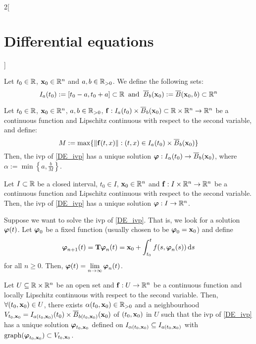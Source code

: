 \documentclass[../../../main_math.tex]{subfiles}
\begin{document}
\begin{multicols}{2}[\section{Differential equations}]
\begin{corollary}
  \end{corollary}
  \begin{definition}
    Let $t_0\in\mathbb{R}$, $\boldsymbol{\mathrm{x}}_0\in\mathbb{R}^n$ and $a,b\in\mathbb{R}_{>0}$. We define the following sets: $$I_a(t_0):=[t_0-a,t_0+a]\subset\mathbb{R}\;\;\text{and}\;\;\overline{B}_{b}(\boldsymbol{\mathrm{x}}_0):=\overline{B}(\boldsymbol{\mathrm{x}}_0,b)\subset\mathbb{R}^n$$
  \end{definition}
  \begin{theorem}\label{DE_picard}
    Let $t_0\in\mathbb{R}$, $\boldsymbol{\mathrm{x}}_0\in\mathbb{R}^n$, $a,b\in\mathbb{R}_{>0}$, $\boldsymbol{\mathrm{f}}:I_a(t_0)\times\overline{B}_{b}(\boldsymbol{\mathrm{x}}_0)\subset\mathbb{R}\times\mathbb{R}^n\rightarrow\mathbb{R}^n$ be a continuous function and Lipschitz continuous with respect to the second variable, and define: $$M:=\max\{\|\boldsymbol{\mathrm{f}}(t,x)\|:(t,x)\in I_a(t_0)\times\overline{B}_{b}(\boldsymbol{\mathrm{x}}_0)\}$$ Then, the ivp of \cref{DE_ivp} has a unique solution $\boldsymbol{\mathrm{\varphi}}:I_\alpha(t_0)\rightarrow\overline{B}_{b}(\boldsymbol{\mathrm{x}}_0)$, where $\alpha:=\min\left\{a,\frac{b}{M}\right\}$.
  \end{theorem}
  \begin{corollary}
    Let $I\subset \mathbb{R}$ be a closed interval, $t_0\in I$, $\boldsymbol{\mathrm{x}}_0\in\mathbb{R}^n$ and $\boldsymbol{\mathrm{f}}:I\times\mathbb{R}^n\rightarrow\mathbb{R}^n$ be a continuous function and Lipschitz continuous with respect to the second variable. Then, the ivp of \cref{DE_ivp} has a unique solution $\boldsymbol{\mathrm{\varphi}}:I\rightarrow\mathbb{R}^n$.
  \end{corollary}
  \begin{corollary}
    Suppose we want to solve the ivp of \cref{DE_ivp}. That is, we look for a solution $\boldsymbol{\mathrm{\varphi}}(t)$. Let $\boldsymbol{\mathrm{\varphi}}_0$ be a fixed function (usually chosen to be $\boldsymbol{\mathrm{\varphi}}_0=\boldsymbol{\mathrm{x}}_0$) and define
    $$\boldsymbol{\mathrm{\varphi}}_{n+1}(t)=\boldsymbol{\mathrm{T}}\boldsymbol{\mathrm{\varphi}}_n(t)=\boldsymbol{\mathrm{x}}_0+\int_{t_0}^tf(s,\boldsymbol{\mathrm{\varphi}}_n(s))\dd{s}$$
    for all $n\geq 0$. Then, $\displaystyle\boldsymbol{\mathrm{\varphi}}(t)=\lim_{n\to\infty}\boldsymbol{\mathrm{\varphi}}_n(t)$.
  \end{corollary}
  \begin{corollary}
    Let $U\subseteq\mathbb{R}\times\mathbb{R}^n$ be an open set and $\boldsymbol{\mathrm{f}}:U\rightarrow\mathbb{R}^n$ be a continuous function and locally Lipschitz continuous with respect to the second variable. Then, $\forall(t_0,\boldsymbol{\mathrm{x}}_0)\in U$, there exists $\alpha(t_0,\boldsymbol{\mathrm{x}}_0)\in\mathbb{R}_{>0}$ and a neighbourhood $V_{t_0,\boldsymbol{\mathrm{x}}_0}=I_{a(t_0,\boldsymbol{\mathrm{x}}_0)}(t_0)\times\overline{B}_{b(t_0,\boldsymbol{\mathrm{x}}_0)}(\boldsymbol{\mathrm{x}}_0)$ of $(t_0,\boldsymbol{\mathrm{x}}_0)$ in $U$ such that the ivp of \cref{DE_ivp} has a unique solution $\boldsymbol{\mathrm{\varphi}}_{t_0,\boldsymbol{\mathrm{x}}_0}$ defined on $I_{\alpha(t_0,\boldsymbol{\mathrm{x}}_0)}\subseteq I_{a(t_0,\boldsymbol{\mathrm{x}}_0)}$ with $\operatorname{graph}(\boldsymbol{\mathrm{\varphi}}_{t_0,\boldsymbol{\mathrm{x}}_0})\subset V_{t_0,\boldsymbol{\mathrm{x}}_0}$.

\end{corollary}
\end{multicols}
\end{document}
